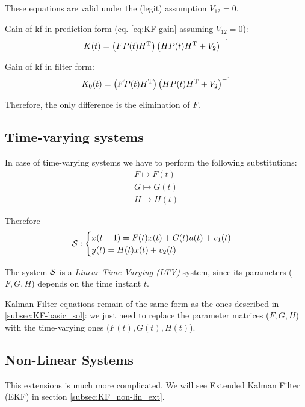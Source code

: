 \begin{remark}
    These equations are valid under the (legit) assumption $V_{12} = 0$.
\end{remark}

\begin{obs}
    Gain of \gls{kf} in prediction form (eq. \ref{eq:KF-gain} assuming $V_{12}=0$):
    \[
        K(t) = \left( FP(t)H^{\mathrm{T}} \right) \left( HP(t)H^{\mathrm{T}}+V_2 \right)^{-1}
    \]

    Gain of \gls{kf} in filter form:
    \[
        K_0(t) = \left(\textcolor{gray}{\cancel{F}} P(t)H\transpose \right) \left( HP(t)H\transpose+V_2 \right)^{-1}
    \]

    Therefore, the only difference is the elimination of $F$.
\end{obs}


\subsection{Time-varying systems}\label{subsec:time-varying_extension}
In case of time-varying systems we have to perform the following substitutions:
\begin{align*}
    F \mapsto F(t) \\
    G \mapsto G(t) \\
    H \mapsto H(t)
\end{align*}

Therefore
\[
    \mathcal{S}: \begin{cases}
        x(t+1) = F(t)x(t) + G(t)u(t) + v_1(t) \\
        y(t) = H(t)x(t) + v_2(t)
    \end{cases}
\]

\begin{definition} 
    The system $\mathcal{S}$ is a \emph{Linear Time Varying (LTV)} system, since its parameters ($F,G,H$) depends on the time instant $t$.
\end{definition}

Kalman Filter equations remain of the same form as the ones described in \ref{subsec:KF-basic_sol}: we just need to replace the parameter matrices ($F,G,H$) with the time-varying ones ($F(t),G(t),H(t)$).

\subsection{Non-Linear Systems}

This extensions is much more complicated. We will see Extended Kalman Filter (EKF) in section \ref{subsec:KF_non-lin_ext}.

